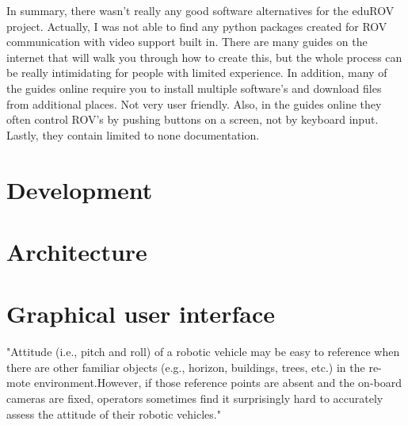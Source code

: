 In summary, there wasn't really any good software alternatives for the eduROV project. Actually, I was not able to find any python packages created for ROV communication with video support built in. There are many guides on the internet that will walk you through how to create this, but the whole process can be really intimidating for people with limited experience. In addition, many of the guides online require you to install multiple software's and download files from additional places. Not very user friendly. Also, in the guides online they often control ROV's by pushing buttons on a screen, not by keyboard input. Lastly, they contain limited to none documentation.

\section{Development}


\section{Architecture}


\section{Graphical user interface}

\citep{Chen2007} "Attitude (i.e., pitch and roll) of a robotic vehicle may be easy to reference when there are other familiar objects (e.g., horizon, buildings, trees, etc.) in the re- mote environment.However, if those reference points are absent and the on-board cameras are fixed, operators sometimes find it surprisingly hard to accurately assess the attitude of their robotic vehicles."

